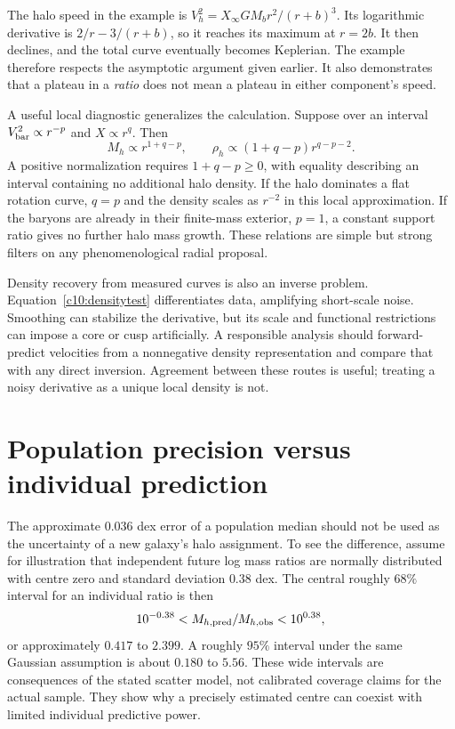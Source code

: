 The halo speed in the example is $V_h^2=X_\infty GM_br^2/(r+b)^3$. Its logarithmic derivative is $2/r-3/(r+b)$, so it reaches its maximum at $r=2b$. It then declines, and the total curve eventually becomes Keplerian. The example therefore respects the asymptotic argument given earlier. It also demonstrates that a plateau in a \emph{ratio} does not mean a plateau in either component's speed.

A useful local diagnostic generalizes the calculation. Suppose over an interval $V_{\rm bar}^2\propto r^{-p}$ and $X\propto r^q$. Then
\begin{equation}
 M_h\propto r^{1+q-p},\qquad
 \rho_h\propto(1+q-p)r^{q-p-2}.
 \label{c10:powerlawpositivity}
\end{equation}
A positive normalization requires $1+q-p\geq0$, with equality describing an interval containing no additional halo density. If the halo dominates a flat rotation curve, $q=p$ and the density scales as $r^{-2}$ in this local approximation. If the baryons are already in their finite-mass exterior, $p=1$, a constant support ratio gives no further halo mass growth. These relations are simple but strong filters on any phenomenological radial proposal.

Density recovery from measured curves is also an inverse problem. Equation~\eqref{c10:densitytest} differentiates data, amplifying short-scale noise. Smoothing can stabilize the derivative, but its scale and functional restrictions can impose a core or cusp artificially. A responsible analysis should forward-predict velocities from a nonnegative density representation and compare that with any direct inversion. Agreement between these routes is useful; treating a noisy derivative as a unique local density is not.

\section{Population precision versus individual prediction}

The approximate $0.036$ dex error of a population median should not be used as the uncertainty of a new galaxy's halo assignment. To see the difference, assume for illustration that independent future log mass ratios are normally distributed with centre zero and standard deviation $0.38$ dex. The central roughly $68\%$ interval for an individual ratio is then
\begin{equation}
 10^{-0.38}<M_{h,{\rm pred}}/M_{h,{\rm obs}}<10^{0.38},
 \label{c10:individual68}
\end{equation}
or approximately $0.417$ to $2.399$. A roughly $95\%$ interval under the same Gaussian assumption is about $0.180$ to $5.56$. These wide intervals are consequences of the stated scatter model, not calibrated coverage claims for the actual sample. They show why a precisely estimated centre can coexist with limited individual predictive power.

